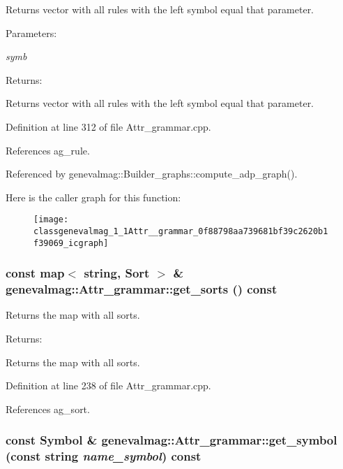 Returns vector with all rules with the left symbol equal that parameter. \begin{Desc}
\item[Parameters:]
\begin{description}
\item[{\em symb}]\end{description}
\end{Desc}
\begin{Desc}
\item[Returns:]\end{Desc}
Returns vector with all rules with the left symbol equal that parameter. 

Definition at line 312 of file Attr\_\-grammar.cpp.

References ag\_\-rule.

Referenced by genevalmag::Builder\_\-graphs::compute\_\-adp\_\-graph().

Here is the caller graph for this function:\nopagebreak
\begin{figure}[H]
\begin{center}
\leavevmode
\texttt{[image: classgenevalmag\_1\_1Attr\_\_grammar\_0f88798aa739681bf39c2620b1f39069\_icgraph]}
\end{center}
\end{figure}
\hypertarget{classgenevalmag_1_1Attr__grammar_9e56cac2670355a2d93e3cd20afc1c2d}{
\subsubsection[{get\_\-sorts}]{\setlength{\rightskip}{0pt plus 5cm}const map$<$ string, {\bf Sort} $>$ \& genevalmag::Attr\_\-grammar::get\_\-sorts () const}}
\label{classgenevalmag_1_1Attr__grammar_9e56cac2670355a2d93e3cd20afc1c2d}


Returns the map with all sorts. \begin{Desc}
\item[Returns:]\end{Desc}
Returns the map with all sorts. 

Definition at line 238 of file Attr\_\-grammar.cpp.

References ag\_\-sort.\hypertarget{classgenevalmag_1_1Attr__grammar_09a1044b5f34ae5794d602716b743129}{
\subsubsection[{get\_\-symbol}]{\setlength{\rightskip}{0pt plus 5cm}const {\bf Symbol} \& genevalmag::Attr\_\-grammar::get\_\-symbol (const string {\em name\_\-symbol}) const}}
\label{classgenevalmag_1_1Attr__grammar_09a1044b5f34ae5794d602716b743129}


